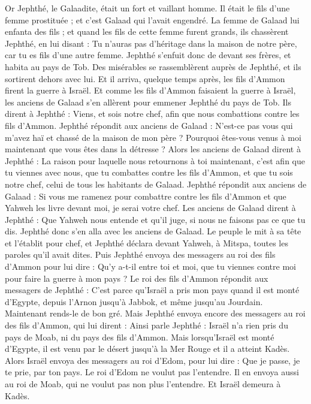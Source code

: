 \begin{multicols}{2}
\VerseOne{}Or Jephthé, le Galaadite, était un fort et vaillant homme. Il était le fils d'une femme prostituée ; et c'est Galaad qui l'avait engendré.
La femme de Galaad lui enfanta des fils ; et quand les fils de cette femme furent grands, ils chassèrent Jephthé, en lui disant : Tu n'auras pas d'héritage dans la maison de notre père, car tu es fils d'une autre femme.
Jephthé s'enfuit donc de devant ses frères, et habita au pays de Tob. Des misérables se rassemblèrent auprès de Jephthé, et ils sortirent dehors avec lui.
Et il arriva, quelque temps après, les fils d'Ammon firent la guerre à Israël.
Et comme les fils d'Ammon faisaient la guerre à Israël, les anciens de Galaad s'en allèrent pour emmener Jephthé du pays de Tob.
Ils dirent à Jephthé : Viens, et sois notre chef, afin que nous combattions contre les fils d'Ammon.
Jephthé répondit aux anciens de Galaad : N'est-ce pas vous qui m'avez haï et chassé de la maison de mon père ? Pourquoi êtes-vous venus à moi maintenant que vous êtes dans la détresse ?
Alors les anciens de Galaad dirent à Jephthé : La raison pour laquelle nous retournons à toi maintenant, c'est afin que tu viennes avec nous, que tu combattes contre les fils d'Ammon, et que tu sois notre chef, celui de tous les habitants de Galaad.
Jephthé répondit aux anciens de Galaad : Si vous me ramenez pour combattre contre les fils d'Ammon et que Yahweh les livre devant moi, je serai votre chef.
Les anciens de Galaad dirent à Jephthé : Que Yahweh nous entende et qu'il juge, si nous ne faisons pas ce que tu dis.
Jephthé donc s'en alla avec les anciens de Galaad. Le peuple le mit à sa tête et l'établit pour chef, et Jephthé déclara devant Yahweh, à Mitspa, toutes les paroles qu'il avait dites.
Puis Jephthé envoya des messagers au roi des fils d'Ammon pour lui dire : Qu'y a-t-il entre toi et moi, que tu viennes contre moi pour faire la guerre à mon pays ?
Le roi des fils d'Ammon répondit aux messagers de Jephthé : C'est parce qu'Israël a pris mon pays quand il est monté d'Egypte, depuis l'Arnon jusqu'à Jabbok, et même jusqu'au Jourdain. Maintenant rends-le de bon gré.
Mais Jephthé envoya encore des messagers au roi des fils d'Ammon,
qui lui dirent : Ainsi parle Jephthé : Israël n'a rien pris du pays de Moab, ni du pays des fils d'Ammon.
Mais lorsqu'Israël est monté d'Egypte, il est venu par le désert jusqu'à la Mer Rouge et il a atteint Kadès.
Alors Israël envoya des messagers au roi d'Edom, pour lui dire : Que je passe, je te prie, par ton pays. Le roi d'Edom ne voulut pas l'entendre. Il en envoya aussi au roi de Moab, qui ne voulut pas non plus l'entendre. Et Israël demeura à Kadès.

\end{multicols}
